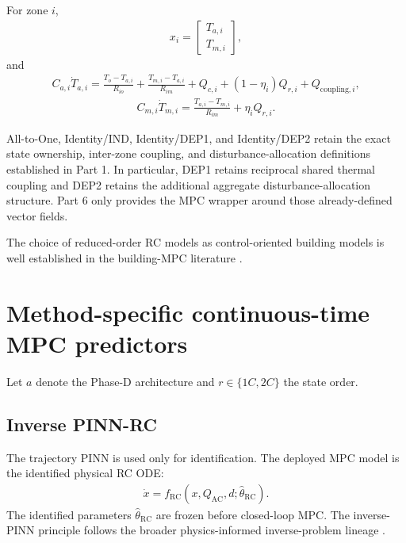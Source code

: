 \documentclass[11pt]{article}
\newcommand{\QAC}{Q_{\mathrm{AC}}}
\begin{document}
For zone \(i\),
\begin{align}
x_i=
\begin{bmatrix}
T_{a,i}\\
T_{m,i}
\end{bmatrix},
\end{align}
and
\begin{align}
\boxed{
C_{a,i}\dot T_{a,i}
=
\frac{T_o-T_{a,i}}{R_{io}}
+
\frac{T_{m,i}-T_{a,i}}{R_{im}}
+
Q_{c,i}
+
(1-\eta_i)Q_{r,i}
+
Q_{\mathrm{coupling},i},
}
\tag{6.6}
\end{align}
\begin{align}
\boxed{
C_{m,i}\dot T_{m,i}
=
\frac{T_{a,i}-T_{m,i}}{R_{im}}
+
\eta_iQ_{r,i}.
}
\tag{6.7}
\end{align}

All-to-One, Identity/IND, Identity/DEP1, and Identity/DEP2 retain the exact state ownership,
inter-zone coupling, and disturbance-allocation definitions established in Part 1.  In
particular, DEP1 retains reciprocal shared thermal coupling and DEP2 retains the additional
aggregate disturbance-allocation structure.  Part 6 only provides the MPC wrapper around those
already-defined vector fields.

The choice of reduced-order RC models as control-oriented building models is well established
in the building-MPC literature \citep{bacher2011heat,ma2012predictive,afram2014review}.

\section{Method-specific continuous-time MPC predictors}

Let \(a\) denote the Phase-D architecture and \(r\in\{1C,2C\}\) the state order.

\subsection{Inverse PINN-RC}

The trajectory PINN is used only for identification.  The deployed MPC model is the identified
physical RC ODE:
\begin{align}
\boxed{
\dot x
=
f_{\mathrm{RC}}
\left(
x,\QAC,d;\widehat\theta_{\mathrm{RC}}
\right).
}
\tag{6.8}
\end{align}
The identified parameters \(\widehat\theta_{\mathrm{RC}}\) are frozen before closed-loop MPC.
The inverse-PINN principle follows the broader physics-informed inverse-problem lineage
\citep{raissi2019pinn}.
\end{document}
